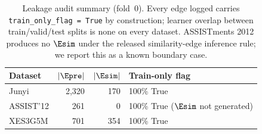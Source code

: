 \begin{table}[t]
\centering
\caption{Leakage audit summary (fold~0). Every edge logged carries
\texttt{train\_only\_flag = True} by construction; learner overlap
between train/valid/test splits is none on every dataset. ASSISTments
2012 produces no $\Esim$ under the released similarity-edge inference
rule; we report this as a known boundary case.}
\label{tab:leakage-audit}
\small
\setlength{\tabcolsep}{6pt}
\renewcommand{\arraystretch}{1.1}
\begin{tabular}{@{}lrrl@{}}
\toprule
Dataset & $|\Epre|$ & $|\Esim|$ & Train-only flag \\
\midrule
Junyi      & 2{,}320 & 170 & 100\% True \\
ASSIST'12  &    261 &   0 & 100\% True ($\Esim$ not generated) \\
XES3G5M    &    701 & 354 & 100\% True \\
\bottomrule
\end{tabular}
\end{table}
